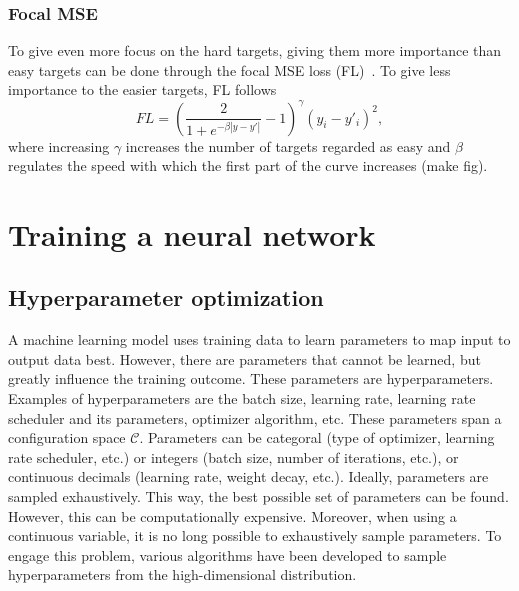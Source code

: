 \subsection{Focal MSE}
To give even more focus on the hard targets, giving them more importance than easy targets can be done through the focal MSE loss (FL)~\cite{Lu2022}.
To give less importance to the easier targets, FL follows
\begin{equation}
    FL = \left(\frac{2}{1 + e^{-\beta |y - y'|}} - 1 \right)^\gamma (y_i - y'_i)^2,
\end{equation}
where increasing $\gamma$ increases the number of targets regarded as easy and $\beta$ regulates the speed with which the first part of the curve increases (make fig).


\chapter{Training a neural network}


\section{Hyperparameter optimization}\label{sec:hparam}

A machine learning model uses training data to learn parameters to map input to output data best.
However, there are parameters that cannot be learned, but greatly influence the training outcome.
These parameters are hyperparameters.
Examples of hyperparameters are the batch size, learning rate, learning rate scheduler and its parameters, optimizer algorithm, etc.
These parameters span a configuration space $\mathcal{C}$.
Parameters can be categoral (type of optimizer, learning rate scheduler, etc.) or integers (batch size, number of iterations, etc.), or continuous decimals (learning rate, weight decay, etc.).
Ideally, parameters are sampled exhaustively.
This way, the best possible set of parameters can be found.
However, this can be computationally expensive.
Moreover, when using a continuous variable, it is no long possible to exhaustively sample parameters.
To engage this problem, various algorithms have been developed to sample hyperparameters from the high-dimensional distribution.

